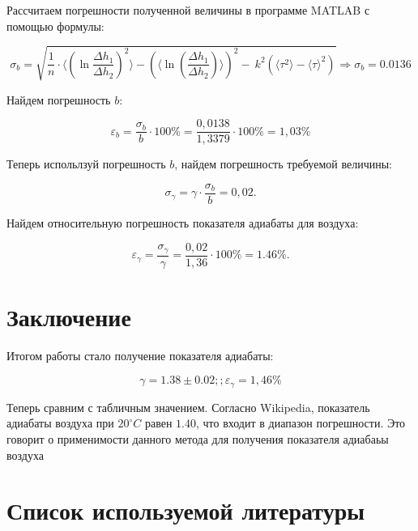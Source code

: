 Рассчитаем погрешности полученной величины в программе MATLAB с помощью формулы:

\begin{equation}
	\sigma_b =\sqrt{\dfrac{1}{n} \cdot \langle\left(\ln \dfrac{\Delta h_1}{\Delta h_2}		\right)^2\rangle - \left(\langle\ln \left(\dfrac{\Delta h_1}{\Delta h_2}\right)\rangle\right)^2 - \ k^2(\langle\tau^2\rangle - \langle\tau\rangle^2)} \Rightarrow \sigma_b = 0.0136
\end{equation} 

Найдем погрешность $b$:

\begin{equation}
	\varepsilon_{b} = \dfrac{\sigma_{b}}{b}\cdot 100 \% = \dfrac{0,0138}{1,3379}\cdot 100 \% =  1,03 \% 
\end{equation} 

Теперь испольлзуй погрешность $b$, найдем погрешность требуемой величины:

\begin{equation}
	\sigma_{\gamma} = \gamma \cdot \dfrac{\sigma_{b}}{b}  =  0,02.
\end{equation} 

Найдем относительную погрешность показателя адиабаты для воздуха:

\begin{equation}
	\varepsilon_{\gamma} = \dfrac{\sigma_{\gamma}}{\gamma} = \dfrac{0,02}{1,36}\cdot 100 \% = 1.46\%.
\end{equation} 
 




\section{Заключение}

Итогом работы стало получение показателя адиабаты:

\begin{equation}
	\gamma = 1.38 \pm 0.02;  ; \varepsilon_{\gamma} = 1,46\% 
\end{equation} 

Теперь сравним с табличным значением. Согласно Wikipedia, показатель адиабаты воздуха при $20^{\circ} C$ равен $1.40$, что входит в диапазон погрешности. Это говорит о применимости данного метода для получения показателя адиабаьы воздуха


\section{Список используемой литературы}

